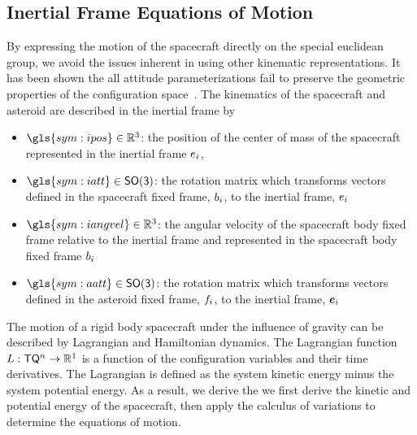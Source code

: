 \subsection{Inertial Frame Equations of Motion}\label{sec:inertial_dumbbell_eoms}
By expressing the motion of the spacecraft directly on the special euclidean group, we avoid the issues inherent in using other kinematic representations.
It has been shown the all attitude parameterizations fail to preserve the geometric properties of the configuration space~\cite{chaturvedi2011a}.
The kinematics of the spacecraft and asteroid are described in the inertial frame by
\begin{itemize}
    \item \( \gls{sym:ipos} \in \R^3 \): the position of the center of mass of the spacecraft represented in the inertial frame \( e_{i} \),
    \item \( \gls{sym:iatt} \in \SO\): the rotation matrix which transforms vectors defined in the spacecraft fixed frame, \( b_{i} \), to the inertial frame, \( e_{i} \)
    \item \( \gls{sym:iangvel} \in \R^3 \): the angular velocity of the spacecraft body fixed frame relative to the inertial frame and represented in the spacecraft body fixed frame \( b_{i} \)
    \item \( \gls{sym:aatt} \in \SO \): the rotation matrix which transforms vectors defined in the asteroid fixed frame, \( f_{i} \), to the inertial frame, \( \bm{e}_i \)
\end{itemize}

The motion of a rigid body spacecraft under the influence of gravity can be described by Lagrangian and Hamiltonian dynamics.
The Lagrangian function \( L : \mathsf{T} \mathsf{Q}^n \to \mathbb{R}^1 \) is a function of the configuration variables and their time derivatives.
The Lagrangian is defined as the system kinetic energy minus the system potential energy.
As a result, we derive the we first derive the kinetic and potential energy of the spacecraft, then apply the calculus of variations to determine the equations of motion.

